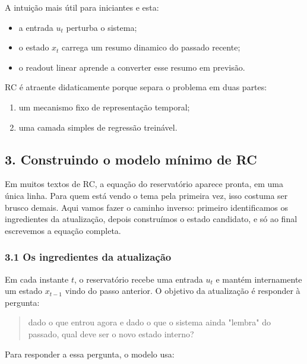 \documentclass[12pt]{article}
\providecommand{\tightlist}{%
  \setlength{\itemsep}{0pt}\setlength{\parskip}{0pt}}
\begin{document}
A intuição mais útil para iniciantes e esta:

\begin{itemize}
\tightlist
\item
  a entrada \(u_t\) perturba o sistema;
\item
  o estado \(x_t\) carrega um resumo dinamico do passado recente;
\item
  o readout linear aprende a converter esse resumo em previsão.
\end{itemize}

RC é atraente didaticamente porque separa o problema em duas partes:

\begin{enumerate}
\def\labelenumi{\arabic{enumi}.}
\tightlist
\item
  um mecanismo fixo de representação temporal;
\item
  uma camada simples de regressão treinável.
\end{enumerate}

\subsection{3. Construindo o modelo mínimo de RC}\label{3-construindo-o-modelo-muxednimo-de-rc}

Em muitos textos de RC, a equação do reservatório aparece pronta, em uma única linha. Para quem está vendo o tema pela primeira vez, isso costuma ser brusco demais. Aqui vamos fazer o caminho inverso: primeiro identificamos os ingredientes da atualização, depois construímos o estado candidato, e só ao final escrevemos a equação completa.

\subsubsection{3.1 Os ingredientes da atualização}\label{31-os-ingredientes-da-atualizauxe7uxe3o}

Em cada instante \(t\), o reservatório recebe uma entrada \(u_t\) e mantém internamente um estado \(x_{t-1}\) vindo do passo anterior. O objetivo da atualização é responder à pergunta:

\begin{quote}
dado o que entrou agora e dado o que o sistema ainda "lembra" do passado, qual deve ser o novo estado interno?
\end{quote}

Para responder a essa pergunta, o modelo usa:
\end{document}
